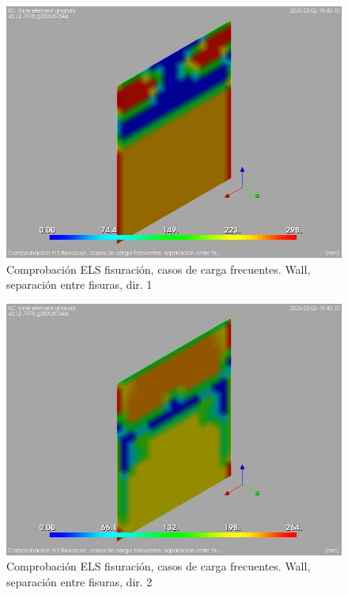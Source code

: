 \begin{figure}[ht]
\begin{center}
\includegraphics[width=\linewidth]{results/graphics/crackingSLS_freq/walls_rmaxSect1}
\caption{Comprobación ELS fisuración, casos de carga frecuentes. Wall, separación entre fisuras, dir. 1}
\label{SLS_frequentLoadsCrackControlwalls_rmaxSect1}
\end{center}
\end{figure}
\begin{figure}[ht]
\begin{center}
\includegraphics[width=\linewidth]{results/graphics/crackingSLS_freq/walls_rmaxSect2}
\caption{Comprobación ELS fisuración, casos de carga frecuentes. Wall, separación entre fisuras, dir. 2}
\label{SLS_frequentLoadsCrackControlwalls_rmaxSect2}
\end{center}
\end{figure}

